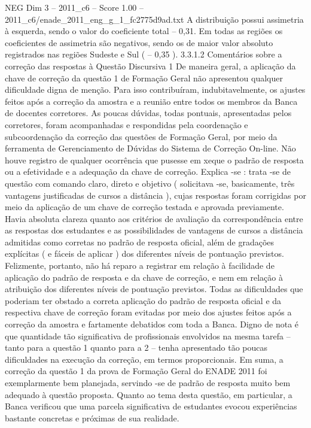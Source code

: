 \begin{textsample}{NEG Dim 3 – 2011\_c6 – Score 1.00 – 2011\_c6/enade\_2011\_eng\_g\_1\_fc2775d9ad.txt}
A distribuição possui assimetria à esquerda, sendo o valor do coeficiente total – 0,31.
Em todas as regiões os coeficientes de assimetria são negativos, sendo os de maior valor absoluto registrados nas regiões Sudeste e Sul ( – 0,35 ). 3.3.1.2 Comentários sobre a correção das respostas à Questão Discursiva 1 De maneira geral, a aplicação da chave de correção da questão 1 de Formação Geral não apresentou qualquer dificuldade digna de menção.
Para isso contribuíram, indubitavelmente, os ajustes feitos após a correção da amostra e a reunião entre todos os membros da Banca de docentes corretores.
As poucas dúvidas, todas pontuais, apresentadas pelos corretores, foram acompanhadas e respondidas pela coordenação e subcoordenação da correção das questões de Formação Geral, por meio da ferramenta de Gerenciamento de Dúvidas do Sistema de Correção On-line.
Não houve registro de qualquer ocorrência que pusesse em xeque o padrão de resposta ou a efetividade e a adequação da chave de correção.
Explica -se : trata -se de questão com comando claro, direto e objetivo ( solicitava -se, basicamente, três vantagens justificadas de cursos a distância ), cujas respostas foram corrigidas por meio da aplicação de um chave de correção testada e aprovada previamente.
Havia absoluta clareza quanto aos critérios de avaliação da correspondência entre as respostas dos estudantes e as possibilidades de vantagens de cursos a distância admitidas como corretas no padrão de resposta oficial, além de gradações explícitas ( e fáceis de aplicar ) dos diferentes níveis de pontuação previstos.
Felizmente, portanto, não há reparo a registrar em relação à facilidade de aplicação do padrão de resposta e da chave de correção, e nem em relação à atribuição dos diferentes níveis de pontuação previstos.
Todas as dificuldades que poderiam ter obstado a correta aplicação do padrão de resposta oficial e da respectiva chave de correção foram evitadas por meio dos ajustes feitos após a correção da amostra e fartamente debatidos com toda a Banca.
Digno de nota é que quantidade tão significativa de profissionais envolvidos na mesma tarefa – tanto para a questão 1 quanto para a 2 – tenha apresentado tão poucas dificuldades na execução da correção, em termos proporcionais.
Em suma, a correção da questão 1 da prova de Formação Geral do ENADE 2011 foi exemplarmente bem planejada, servindo -se de padrão de resposta muito bem adequado à questão proposta.
Quanto ao tema desta questão, em particular, a Banca verificou que uma parcela significativa de estudantes evocou experiências bastante concretas e próximas de sua realidade.

\end{textsample}
